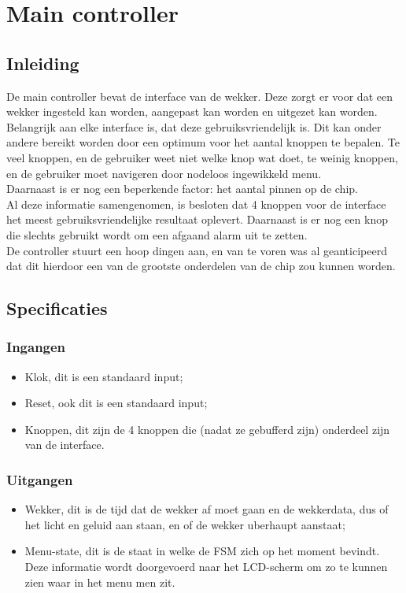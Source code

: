 \chapter{Main controller}
\section{Inleiding}
De main controller bevat de interface van de wekker. Deze zorgt er voor dat een wekker ingesteld kan worden, aangepast kan worden en uitgezet kan worden. Belangrijk aan elke interface is, dat deze gebruiksvriendelijk is. Dit kan onder andere bereikt worden door een optimum voor het aantal knoppen te bepalen. Te veel knoppen, en de gebruiker weet niet welke knop wat doet, te weinig knoppen, en de gebruiker moet navigeren door nodeloos ingewikkeld menu. \\
Daarnaast is er nog een beperkende factor: het aantal pinnen op de chip. \\
Al deze informatie samengenomen, is besloten dat 4 knoppen voor de interface het meest gebruiksvriendelijke resultaat oplevert. Daarnaast is er nog een knop die slechts gebruikt wordt om een afgaand alarm uit te zetten. \\
De controller stuurt een hoop dingen aan, en van te voren was al geanticipeerd dat dit hierdoor een van de grootste onderdelen van de chip zou kunnen worden.

\section{Specificaties}
\subsection{Ingangen}
\begin{itemize}[nolistsep]
\item Klok, dit is een standaard input;
\item Reset, ook dit is een standaard input;
\item Knoppen, dit zijn de 4 knoppen die (nadat ze gebufferd zijn) onderdeel zijn van de interface.
\end{itemize}

\subsection{Uitgangen}
\begin{itemize}[nolistsep]
\item Wekker, dit is de tijd dat de wekker af moet gaan en de wekkerdata, dus of het licht en geluid aan staan, en of de wekker uberhaupt aanstaat;
\item Menu-state, dit is de staat in welke de FSM zich op het moment bevindt. Deze informatie wordt doorgevoerd naar het LCD-scherm om zo te kunnen zien waar in het menu men zit.
\end{itemize}

